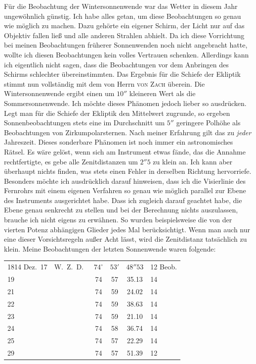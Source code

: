 \par\indent Für die Beobachtung der Wintersonnenwende war das Wetter in diesem Jahr ungewöhnlich günstig. Ich habe alles getan, um diese Beobachtungen so genau wie möglich zu machen. Dazu gehörte ein eigener Schirm, der Licht nur auf das Objektiv fallen ließ und alle anderen Strahlen abhielt. Da ich diese Vorrichtung bei meinen Beobachtungen früherer Sonnenwenden noch nicht angebracht hatte, wollte ich diesen Beobachtungen kein volles Vertrauen schenken. Allerdings kann ich eigentlich nicht sagen, dass die Beobachtungen vor dem Anbringen des Schirms schlechter übereinstimmten. Das Ergebnis für die Schiefe der Ekliptik stimmt nun vollständig mit dem von Herrn \textsc{von Zach} überein. Die Wintersonnenwende ergibt einen um $10''$ kleineren Wert als die Sommersonnenwende. Ich möchte dieses Phänomen jedoch lieber so ausdrücken. Legt man für die Schiefe der Ekliptik den Mittelwert zugrunde, so ergeben Sonnenbeobachtungen stets eine im Durchschnitt um $5''$ geringere Polhöhe als Beobachtungen von Zirkumpolarsternen. Nach meiner Erfahrung gilt das zu \emph{jeder} Jahreszeit. Dieses sonderbare Phänomen ist noch immer ein astronomisches Rätsel. Es wäre gelöst, wenn sich am Instrument etwas fände, das die Annahme rechtfertigte, es gebe alle Zenitdistanzen um $2''5$ zu klein an. Ich kann aber überhaupt nichts finden, was stets einen Fehler in derselben Richtung hervorriefe. Besonders möchte ich ausdrücklich darauf hinweisen, dass ich die Visierlinie des Fernrohrs mit einem eigenen Verfahren so genau wie möglich parallel zur Ebene des Instruments ausgerichtet habe. Dass ich zugleich darauf geachtet habe, die Ebene genau senkrecht zu stellen und bei der Berechnung nichts auszulassen, brauche ich nicht eigens zu erwähnen. So wurden beispielsweise die von der vierten Potenz abhängigen Glieder jedes Mal berücksichtigt. Wenn man auch nur eine dieser Vorsichtsregeln außer Acht lässt, wird die Zenitdistanz tatsächlich zu klein. Meine Beobachtungen der letzten Sonnenwende waren folgende:

\begin{center}
\fontsize{10}{12}\selectfont\setlength{\tabcolsep}{5pt}\renewcommand{\arraystretch}{1.15}\begin{tabular}{l l ccc l}
1814 Dez.\ 17 & W.\ Z.\ D.\ & $74^\circ$ & $53'$ & $48''53$ & 12 Beob. \\
19 & & 74 & 57 & 35.13 & 14 \\
21 & & 74 & 59 & 24.02 & 14 \\
22 & & 74 & 59 & 38.63 & 14 \\
23 & & 74 & 59 & 21.10 & 14 \\
24 & & 74 & 58 & 36.74 & 14 \\
25 & & 74 & 57 & 22.29 & 14 \\
29 & & 74 & 57 & 51.39 & 12 \\
\end{tabular}
\end{center}

